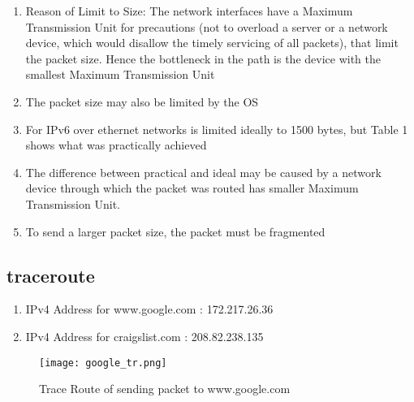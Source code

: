 \documentclass[12pt]{article}
\begin{document}
\begin{enumerate}
\begin{enumerate}
        \item Reason of Limit to Size: The network interfaces have a Maximum Transmission Unit for precautions (not to overload a server or a network device, which would disallow the timely servicing of all packets), that limit the packet size. Hence the bottleneck in the path is the device with the smallest Maximum Transmission Unit 
        \item The packet size may also be limited by the OS
        \item For IPv6 over ethernet networks is limited ideally to 1500 bytes, but Table 1 shows what was practically achieved 
        \item The difference between practical and ideal may be caused by a network device through which the packet was routed has smaller Maximum Transmission Unit.
        \item To send a larger packet size, the packet must be fragmented
    \end{enumerate}
\end{enumerate}

\subsection{traceroute}
\begin{enumerate}
    \item IPv4 Address for www.google.com : 172.217.26.36
    \item IPv4 Address for craigslist.com : 208.82.238.135
\end{enumerate}

\begin{figure}[h!]
    \centering
    \texttt{[image: google\_tr.png]}
    \caption{Trace Route of sending packet to www.google.com}
\end{figure}
\end{document}
